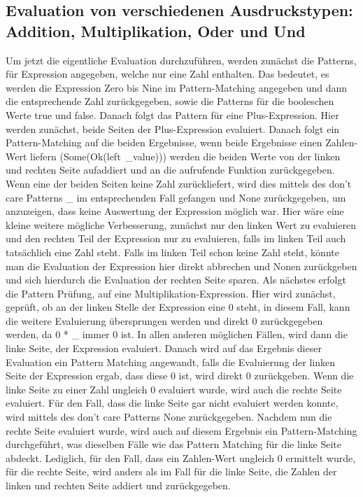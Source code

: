 \documentclass[a4paper, 1ppt]{article}
\begin{document}
\subsection{Evaluation von verschiedenen Ausdruckstypen: Addition, Multiplikation, Oder und Und}
Um jetzt die eigentliche Evaluation durchzuführen, werden zunächst die Patterns, für Expression angegeben, welche nur eine Zahl enthalten. Das bedeutet, es werden die Expression Zero bis Nine im Pattern-Matching angegeben und dann die entsprechende Zahl zurückgegeben, sowie die Patterns für die booleschen Werte true und false.
Danach folgt das Pattern für eine Plus-Expression. Hier werden zunächst, beide Seiten der Plus-Expression evaluiert. Danach folgt ein Pattern-Matching auf die beiden Ergebnisse, wenn beide Ergebnisse einen Zahlen-Wert liefern (Some(Ok(left\
\_value))) werden die beiden Werte von der linken und rechten Seite aufaddiert und an die aufrufende Funktion zurückgegeben. Wenn eine der beiden Seiten keine Zahl zurückliefert, wird dies mittels des don't care Patterns \_ im entsprechenden Fall gefangen und None zurückgegeben, um anzuzeigen, dass keine Auswertung der Expression möglich war. Hier wäre eine kleine weitere mögliche Verbesserung, zunächst nur den linken Wert zu evaluieren und den rechten Teil der Expression nur zu evaluieren, falls im linken Teil auch tatsächlich eine Zahl steht. Falls im linken Teil schon keine Zahl steht, könnte man die Evaluation der Expression hier direkt abbrechen und Nonen zurückgeben und sich hierdurch die Evaluation der rechten Seite sparen.
Als nächstes erfolgt die Pattern Prüfung, auf eine Multiplikation-Expression. Hier wird zunächst, geprüft, ob an der linken Stelle der Expression eine 0 steht, in diesem Fall, kann die weitere Evaluierung übersprungen werden und direkt 0 zurückgegeben werden, da 0 * \_ immer 0 ist. In allen anderen möglichen Fällen, wird dann die linke Seite, der Expression evaluiert. Danach wird auf das Ergebnis dieser Evaluation ein Pattern Matching angewandt, falls die Evaluierung der linken Seite der Expression ergab, dass diese 0 ist, wird direkt 0 zurückgeben. Wenn die linke Seite zu einer Zahl ungleich 0 evaluiert wurde, wird auch die rechte Seite evaluiert. Für den Fall, dass die linke Seite gar nicht evaluiert werden konnte, wird mittels des don't care Patterns None zurückgegeben. Nachdem nun die rechte Seite evaluiert wurde, wird auch auf diesem Ergebnis ein Pattern-Matching durchgeführt, was dieselben Fälle wie das Pattern Matching für die linke Seite abdeckt. Lediglich, für den Fall, dass ein Zahlen-Wert ungleich 0 ermittelt wurde, für die rechte Seite, wird anders als im Fall für die linke Seite, die Zahlen der linken und rechten Seite addiert und zurückgegeben.
\end{document}
